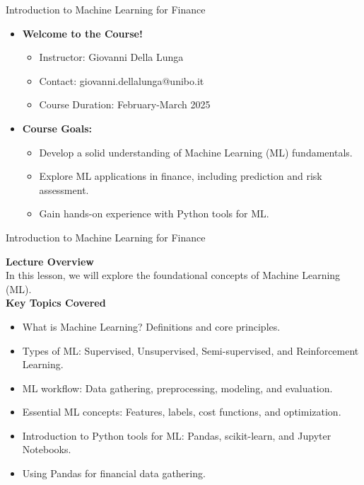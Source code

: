 \documentclass[11pt]{beamer}
\begin{document}
\begin{frame}{Introduction to Machine Learning for Finance}
\begin{itemize}
\item \textbf{Welcome to the Course!}
\vspace{.5cm}
\begin{itemize}
\item Instructor: Giovanni Della Lunga
\item Contact: giovanni.dellalunga@unibo.it
\item Course Duration: February-March 2025
\end{itemize}
\vspace{.5cm}
\item \textbf{Course Goals:}
\vspace{.5cm}
\begin{itemize}
\item Develop a solid understanding of Machine Learning (ML) fundamentals.
\item Explore ML applications in finance, including prediction and risk assessment.
\item Gain hands-on experience with Python tools for ML.
\end{itemize}
\end{itemize}
\end{frame}
\begin{frame}{Introduction to Machine Learning for Finance}

\textbf{Lecture Overview}\\

In this lesson, we will explore the foundational concepts of Machine Learning (ML). \\

\textbf{Key Topics Covered}\\

\begin{itemize}
\item What is Machine Learning? Definitions and core principles.
\item Types of ML: Supervised, Unsupervised, Semi-supervised, and Reinforcement Learning.
\item ML workflow: Data gathering, preprocessing, modeling, and evaluation.
\item Essential ML concepts: Features, labels, cost functions, and optimization.
\item Introduction to Python tools for ML: Pandas, scikit-learn, and Jupyter Notebooks.
\item Using Pandas for financial data gathering.
\end{itemize}
\end{frame}
\end{document}
